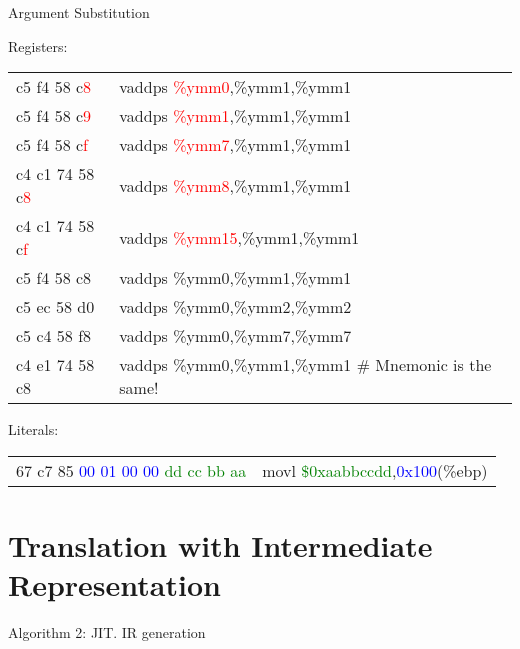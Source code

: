 \begin{frame}{Argument Substitution}

{\ttfamily\small
{\sffamily Registers:}

\begin{tabular}{ll}  
c5 f4 58 c\textcolor{red}{8}  &    vaddps \textcolor{red}{\%ymm0},\%ymm1,\%ymm1 \\
c5 f4 58 c\textcolor{red}{9}  &    vaddps \textcolor{red}{\%ymm1},\%ymm1,\%ymm1 \\
c5 f4 58 c\textcolor{red}{f}  &    vaddps \textcolor{red}{\%ymm7},\%ymm1,\%ymm1 \\\pause
c4 c1 74 58 c\textcolor{red}{8} &  vaddps \textcolor{red}{\%ymm8},\%ymm1,\%ymm1 \\
c4 c1 74 58 c\textcolor{red}{f} &  vaddps \textcolor{red}{\%ymm15},\%ymm1,\%ymm1 \\
c5 f4 58 c8  &    vaddps \%ymm0,\%ymm1,\%ymm1 \\
c5 ec 58 d0  &    vaddps \%ymm0,\%ymm2,\%ymm2 \\
c5 c4 58 f8  &    vaddps \%ymm0,\%ymm7,\%ymm7 \\\pause
c4 e1 74 58 c8 &  vaddps \%ymm0,\%ymm1,\%ymm1 \# Mnemonic is the same!\\
\end{tabular}
\pause
{\sffamily Literals:}
\begin{tabular}{ll}
67 c7 85 \textcolor{blue}{00 01 00 00} \textcolor{green}{dd cc bb aa}   & movl \textcolor{green}{\$0xaabbccdd},\textcolor{blue}{0x100}(\%ebp)
\end{tabular}
}

\end{frame}

\section{Translation with Intermediate Representation}

\begin{frame}{Algorithm 2: JIT. IR generation}
\centering
{}
\end{frame}

